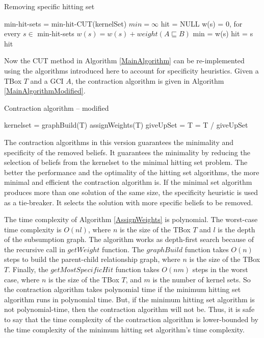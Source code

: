 \begin{algorithm}
\caption{Removing specific hitting set}
\label{RemoveSpecific}
\begin{algorithmic}[1]
\State min-hit-sets = min-hit-CUT(kernelSet)
\State $min = \infty$
\State hit = NULL
\State w(s) = 0, for every $s \in $ min-hit-sets
\State $w(s) = w(s) + weight(A \sqsubseteq B)$
\EndFor
{}
\State min = w(s)
\State hit = s
\EndIf
\EndFor
\State
\Return hit
\EndFunction
\end{algorithmic}
\end{algorithm}

Now the CUT method in Algorithm \ref{MainAlgorithm} can be re-implemented using the algorithms introduced here to account for specificity heuristics. Given a TBox $T$ and a GCI $A$, the contraction algorithm is given in Algorithm \ref{MainAlgorithmModified}.

\begin{algorithm}
\caption{Contraction algorithm -- modified}
\label{MainAlgorithmModified}
\begin{algorithmic}[1]
\State kernelset = 
\State graphBuild(T)
\State assignWeights(T)
\State giveUpSet = 
\State T = T / giveUpSet
\EndProcedure
\end{algorithmic}
\end{algorithm}

The contraction algorithms in this version guarantees the minimality and specificity of the removed beliefs. It guarantees the minimality by reducing the selection of beliefs from the kernelset to the minimal hitting set problem. The better the performance and the optimality of the hitting set algorithms, the more minimal and efficient the contraction algorithm is. If the minimal set algorithm produces more than one solution of the same size, the specificity heuristic is used as a tie-breaker. It selects the solution with more specific beliefs to be removed.

The time complexity of Algorithm \ref{AssignWeights} is polynomial. The worst-case time complexity is $O(nl)$, where $n$ is the size of the TBox $T$ and $l$ is the depth of the subsumption graph. The algorithm works as depth-first search because of the recursive call in $getWeight$ function. The $graphBuild$ function takes $O(n)$ steps to build the parent-child relationship graph, where $n$ is the size of the TBox $T$. Finally, the $getMostSpecificHit$ function takes $O(nm)$ steps in the worst case, where $n$ is the size of the TBox $T$, and $m$ is the number of kernel sets. So the contraction algorithm takes polynomial time if the minimum hitting set algorithm runs in polynomial time. But, if the minimum hitting set algorithm is not polynomial-time, then the contraction algorithm will not be. Thus, it is safe to say that the time complexity of the contraction algorithm is lower-bounded by the time complexity of the minimum hitting set algorithm's time complexity.